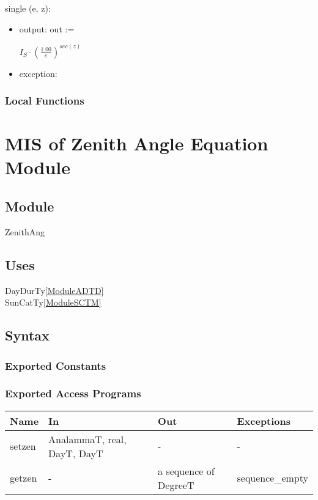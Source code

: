 \documentclass[12pt, titlepage]{article}
\begin{document}
\noindent single (e, z):
\begin{itemize}
\item output: out := 
\begin{center}\large
$I_{S} \cdot (\frac{1.00}{e})^{sec(z)} $
\end{center}
\item exception: 
\end{itemize}

\subsubsection{Local Functions}


\section{MIS of Zenith Angle Equation Module} \label{ModuleZA} 

\subsection{Module}
ZenithAng


\subsection{Uses}
DayDurTy\ref{ModuleADTD}\\
SunCatTy\ref{ModuleSCTM}

\subsection{Syntax}

\subsubsection{Exported Constants}


\subsubsection{Exported Access Programs}

\begin{center}
\begin{tabular}{p{2cm} p{5cm} p{4cm} p{1cm}}
\hline
\textbf{Name} & \textbf{In} & \textbf{Out} & \textbf{Exceptions} \\
\hline 
setzen & AnalammaT, real, DayT, DayT & -  & -\\
getzen &  -  & a sequence of DegreeT & sequence\_empty \\

\hline
\end{tabular}
\end{center}
\end{document}
